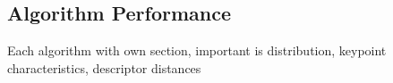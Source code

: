 \subsection{Algorithm Performance}

Each algorithm with own section, important is distribution, keypoint characteristics, descriptor distances
